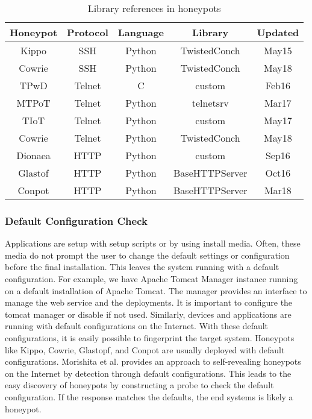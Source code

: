 \begin{table}
\begin{tabular}{||c c c c c||} 
 \hline
 Honeypot & Protocol & Language & Library & Updated \\ [0.5ex] 
 \hline
 Kippo  & SSH    & Python &  TwistedConch & May15 \\ 
 Cowrie & SSH    & Python &  TwistedConch & May18 \\
 TPwD   & Telnet & C      &  custom       & Feb16 \\
 MTPoT  & Telnet & Python &  telnetsrv    & Mar17 \\
 TIoT   & Telnet & Python &  custom       & May17 \\
 Cowrie & Telnet & Python &  TwistedConch & May18 \\
 Dionaea& HTTP   & Python &  custom       & Sep16 \\
 Glastof& HTTP   & Python &  BaseHTTPServer& Oct16 \\
 Conpot & HTTP   & Python &  BaseHTTPServer& Mar18 \\ [1ex] 
 \hline
\end{tabular}
\caption{Library references in honeypots}
\label{library}
\end{table}


\subsubsection{Default Configuration Check}
Applications are setup with setup scripts or by using install media. Often, these media do not prompt the user to change the default settings or configuration before the final installation. This leaves the system running with a default configuration. For example, we have Apache Tomcat Manager instance running on a default installation of Apache Tomcat. The manager provides an interface to manage the web service and the deployments. It is important to configure the tomcat manager or disable if not used. Similarly, devices and applications are running with default configurations on the Internet. With these default configurations, it is easily possible to fingerprint the target system. Honeypots like Kippo, Cowrie, Glastopf, and Conpot are usually deployed with default configurations. Morishita et al. \cite{morishita} provides an approach to self-revealing honeypots on the Internet by detection through default configurations.  This leads to the easy discovery of honeypots by constructing a probe to check the default configuration. If the response matches the defaults, the end systems is likely a honeypot.
\newline
